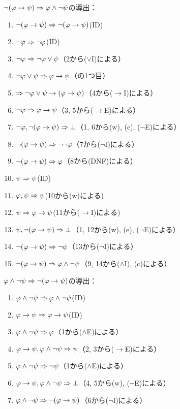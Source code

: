 \(\lnot \paren{\varphi \to \psi} \sequent \varphi \land \lnot \psi\)の導出：
\begin{enumerate}
	\item \(\lnot \paren{\varphi \to \psi} \sequent \lnot \paren{\varphi \to \psi}\)\quad (ID)
	\item \(\lnot \varphi \Rightarrow \lnot \varphi\)\quad (ID)
	\item \(\lnot \varphi \Rightarrow \lnot \varphi \lor \psi\)\quad （2から(\(\lor\)I)による）
	\item \(\lnot \varphi \lor \psi \Rightarrow \varphi \to \psi\)\quad （の1つ目）
	\item \(\sequent \lnot \varphi \lor \psi \to \paren{\varphi \to \psi}\)\quad （4から(\(\to\)I)による）
	\item \(\lnot \varphi \Rightarrow \varphi \to \psi\)\quad （3, 5から(\(\to\)E)による）
	\item \(\lnot \varphi, \lnot \paren{\varphi \to \psi} \sequent \bot\)\quad （1, 6から(w), (e), (\(\lnot\)E)による）
	\item \(\lnot \paren{\varphi \to \psi} \sequent \lnot \lnot \varphi\)\quad （7から(\(\lnot\)I)による）
	\item \(\lnot \paren{\varphi \to \psi} \sequent \varphi\)\quad （8から(DNF)による）
	\item \(\psi \Rightarrow \psi\)\quad (ID)
	\item \(\varphi, \psi \Rightarrow \psi\)\quad (10から(w)による)
	\item \(\psi \Rightarrow \varphi \to \psi\)\quad (11から(\(\to\)I)による)
	\item \(\psi, \lnot \paren{\varphi \to \psi} \sequent \bot\)\quad （1, 12から(w), (e), (\(\lnot\)E)による）
	\item \(\lnot \paren{\varphi \to \psi} \sequent \lnot \psi\)\quad （13から(\(\lnot\)I)による）
	\item \(\lnot \paren{\varphi \to \psi} \sequent \varphi \land \lnot \psi\)\quad （9, 14から(\(\land\)I), (c)による）
\end{enumerate}

\(\varphi \land \lnot \psi \sequent \lnot \paren{\varphi \to \psi}\)の導出：
\begin{enumerate}
	\item \(\varphi \land \lnot \psi \Rightarrow \varphi \land \lnot \psi\)\quad (ID)
	\item \(\varphi \to \psi \Rightarrow \varphi \to \psi\)\quad (ID)
	\item \(\varphi \land \lnot \psi \Rightarrow \varphi\)\quad （1から(\(\land\)E)による）
	\item \(\varphi \to \psi, \varphi \land \lnot \psi \Rightarrow \psi\)\quad （2, 3から(\(\to\)E)による）
	\item \(\varphi \land \lnot \psi \Rightarrow \lnot \psi\)\quad （1から(\(\land\)E)による）
	\item \(\varphi \to \psi, \varphi \land \lnot \psi \Rightarrow \bot\)\quad （4, 5から(w), (\(\lnot\)E)による）
	\item \(\varphi \land \lnot \psi \sequent \lnot \paren{\varphi \to \psi}\)\quad （6から(\(\lnot\)I)による）
\end{enumerate}

